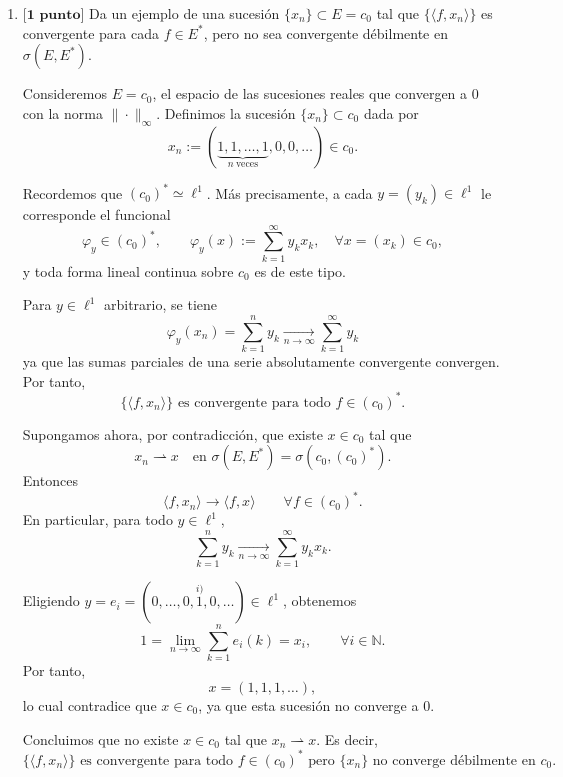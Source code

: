 \documentclass[12pt]{article}
\begin{document}
\begin{ejercicio}
\begin{enumerate}[label=\alph*)]
                
            \item $\textbf{[1 punto]}$ Da un ejemplo de una sucesión $\{x_n\}\subset E = c_0$ tal que $\{\langle f,x_n \rangle \}$ es convergente para cada $f\in E^\ast$, pero no sea convergente débilmente en $\sigma(E,E^\ast)$.

            Consideremos $E=c_0$, el espacio de las sucesiones reales que convergen a $0$ con la norma $\|\cdot\|_\infty$.
            Definimos la sucesión $\{x_n\}\subset c_0$ dada por
            \[
            x_n := (\underbrace{1,1,\dots,1}_{n\ \text{veces}},0,0,\dots) \in c_0.
            \]
            
            Recordemos que $(c_0)^\ast \simeq \ell^1$. Más precisamente, a cada $y=(y_k)\in \ell^1$ le corresponde el funcional
            \[
            \varphi_y \in (c_0)^\ast, 
            \qquad 
            \varphi_y(x) := \sum_{k=1}^\infty y_k x_k,
            \quad \forall x=(x_k)\in c_0,
            \]
            y toda forma lineal continua sobre $c_0$ es de este tipo.
            
            Para $y\in \ell^1$ arbitrario, se tiene
            \[
            \varphi_y(x_n)
            =
            \sum_{k=1}^n y_k
            \xrightarrow[n\to\infty]{}
            \sum_{k=1}^\infty y_k
            \]
            ya que las sumas parciales de una serie absolutamente convergente convergen.
            Por tanto,
            \[
            \{\langle f,x_n\rangle\} \text{ es convergente para todo } f\in (c_0)^\ast.
            \]
            
            Supongamos ahora, por contradicción, que existe $x\in c_0$ tal que
            \[
            x_n \rightharpoonup x \quad \text{en } \sigma(E,E^\ast)=\sigma(c_0,(c_0)^\ast).
            \]
            Entonces
            \[
            \langle f,x_n\rangle \longrightarrow \langle f,x\rangle
            \qquad \forall f\in (c_0)^\ast.
            \]
            En particular, para todo $y\in \ell^1$,
            \[
            \sum_{k=1}^n y_k
            \xrightarrow[n\to\infty]{}
            \sum_{k=1}^\infty y_k x_k.
            \]
            
            Eligiendo $y=e_i=(0,\dots,0,\overset{i)}{1},0,\dots)\in \ell^1$, obtenemos
            \[
            1 = \lim_{n\to\infty} \sum_{k=1}^n e_i(k) = x_i,
            \qquad \forall i\in \mathbb{N}.
            \]
            Por tanto,
            \[
            x=(1,1,1,\dots),
            \]
            lo cual contradice que $x\in c_0$, ya que esta sucesión no converge a $0$.
            
            Concluimos que no existe $x\in c_0$ tal que $x_n \rightharpoonup x$. Es decir,
            \[
            \{\langle f,x_n\rangle\} \text{ es convergente para todo } f\in (c_0)^\ast \text{ pero } \{x_n\} \text{ no converge débilmente en } c_0.
            \]
            
        \end{enumerate}
    \end{ejercicio}
    
\end{document}
